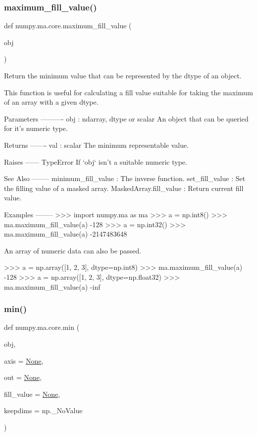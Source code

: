 \subsubsection{\texorpdfstring{maximum\+\_\+fill\+\_\+value()}{maximum\_fill\_value()}}
{\footnotesize\ttfamily def numpy.\+ma.\+core.\+maximum\+\_\+fill\+\_\+value (\begin{DoxyParamCaption}\item[{}]{obj }\end{DoxyParamCaption})}

\begin{DoxyVerb}Return the minimum value that can be represented by the dtype of an object.

This function is useful for calculating a fill value suitable for
taking the maximum of an array with a given dtype.

Parameters
----------
obj : ndarray, dtype or scalar
    An object that can be queried for it's numeric type.

Returns
-------
val : scalar
    The minimum representable value.

Raises
------
TypeError
    If `obj` isn't a suitable numeric type.

See Also
--------
minimum_fill_value : The inverse function.
set_fill_value : Set the filling value of a masked array.
MaskedArray.fill_value : Return current fill value.

Examples
--------
>>> import numpy.ma as ma
>>> a = np.int8()
>>> ma.maximum_fill_value(a)
-128
>>> a = np.int32()
>>> ma.maximum_fill_value(a)
-2147483648

An array of numeric data can also be passed.

>>> a = np.array([1, 2, 3], dtype=np.int8)
>>> ma.maximum_fill_value(a)
-128
>>> a = np.array([1, 2, 3], dtype=np.float32)
>>> ma.maximum_fill_value(a)
-inf\end{DoxyVerb}
 \mbox{\label{namespacenumpy_1_1ma_1_1core_a23b085d08dcedf6a2ed744b37de0a282}} 
\subsubsection{\texorpdfstring{min()}{min()}}
{\footnotesize\ttfamily def numpy.\+ma.\+core.\+min (\begin{DoxyParamCaption}\item[{}]{obj,  }\item[{}]{axis = {\ttfamily \hyperlink{namespacenumpy_1_1ma_1_1core_a647ee1848dfa3692fe35a663a2aa40b3}{None}},  }\item[{}]{out = {\ttfamily \hyperlink{namespacenumpy_1_1ma_1_1core_a647ee1848dfa3692fe35a663a2aa40b3}{None}},  }\item[{}]{fill\+\_\+value = {\ttfamily \hyperlink{namespacenumpy_1_1ma_1_1core_a647ee1848dfa3692fe35a663a2aa40b3}{None}},  }\item[{}]{keepdims = {\ttfamily np.\+\_\+NoValue} }\end{DoxyParamCaption})}

